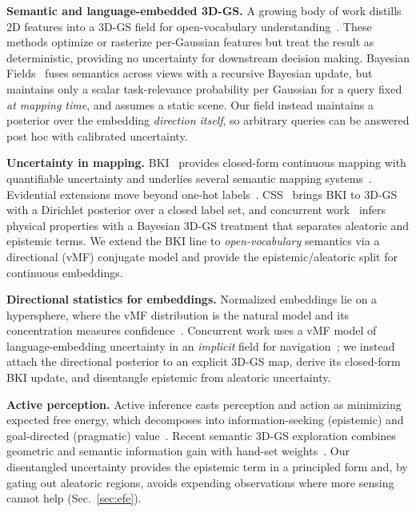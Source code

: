 \documentclass[journal]{IEEEtran}
\begin{document}
\textbf{Semantic and language-embedded 3D-GS.} A growing body of work distills
2D features into a 3D-GS field for open-vocabulary
understanding~\cite{qin2024langsplat, zhou2024feature, wu2024opengaussian}.
These methods optimize or rasterize per-Gaussian features but treat the result
as deterministic, providing no uncertainty for downstream decision making.
Bayesian Fields~\cite{maggio2025bayesian} fuses semantics across views with a
recursive Bayesian update, but maintains only a scalar task-relevance
probability per Gaussian for a query fixed \emph{at mapping time}, and assumes
a static scene. Our field instead maintains a posterior over the embedding
\emph{direction itself}, so arbitrary queries can be answered post hoc with
calibrated uncertainty.

\textbf{Uncertainty in mapping.} BKI~\cite{vegabrown2014} provides closed-form
continuous mapping with quantifiable uncertainty and underlies several semantic
mapping systems~\cite{gan2020bayesian}. Evidential extensions move beyond one-hot
labels~\cite{kim2025e2bki}. CSS~\cite{wilson2025css} brings BKI to 3D-GS with a
Dirichlet posterior over a closed label set, and concurrent
work~\cite{liu2025physgs} infers physical properties with a Bayesian 3D-GS
treatment that separates aleatoric and epistemic terms. We extend the BKI line
to \emph{open-vocabulary} semantics via a directional (vMF) conjugate model and
provide the epistemic/aleatoric split for continuous embeddings.

\textbf{Directional statistics for embeddings.} Normalized embeddings lie on a
hypersphere, where the vMF distribution is the natural model and its
concentration measures
confidence~\cite{mardia2000directional, banerjee2005vmf}. Concurrent work uses
a vMF model of language-embedding uncertainty in an \emph{implicit} field for
navigation~\cite{lee2026lamp}; we instead attach the directional posterior to
an explicit 3D-GS map, derive its closed-form BKI update, and disentangle
epistemic from aleatoric uncertainty.

\textbf{Active perception.} Active inference casts perception and action as
minimizing expected free energy, which decomposes into information-seeking
(epistemic) and goal-directed (pragmatic) value~\cite{friston2010,
parr2022active}. Recent semantic 3D-GS exploration combines geometric and
semantic information gain with hand-set weights~\cite{nagami2025vista}. Our
disentangled uncertainty
provides the epistemic term in a principled form and, by gating out aleatoric
regions, avoids expending observations where more sensing cannot help
(Sec.~\ref{sec:efe}).
\end{document}
